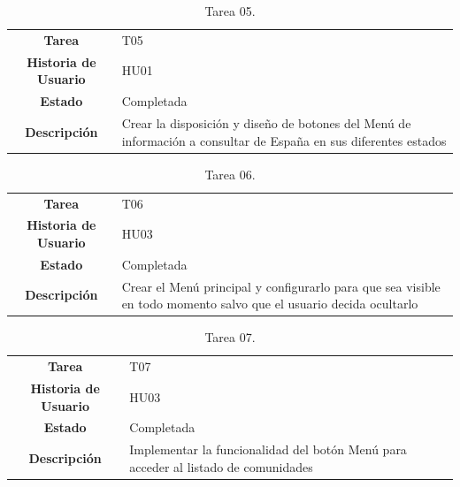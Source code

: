 \begin{table}[H]
	\begin{center}
		\begin{tabular}{| c | p{9cm} |}
			\hline
			
			\textbf{Tarea} & T05 \\
			\textbf{Historia de Usuario} & HU01 \\
			\textbf{Estado} & Completada \\
			\textbf{Descripción} & Crear la disposición y diseño de botones del Menú de información a consultar de España en sus diferentes estados \\ \hline
		\end{tabular}
		\caption{Tarea 05.}
	\end{center}
\end{table}

\begin{table}[H]
	\begin{center}
		\begin{tabular}{| c | p{9cm} |}
			\hline
			
			\textbf{Tarea} & T06 \\
			\textbf{Historia de Usuario} & HU03 \\
			\textbf{Estado} & Completada \\
			\textbf{Descripción} & Crear el Menú principal y configurarlo para que sea visible en todo momento salvo que el usuario decida ocultarlo \\ \hline
		\end{tabular}
		\caption{Tarea 06.}
	\end{center}
\end{table}

\begin{table}[H]
	\begin{center}
		\begin{tabular}{| c | p{9cm} |}
			\hline
			
			\textbf{Tarea} & T07 \\
			\textbf{Historia de Usuario} & HU03 \\
			\textbf{Estado} & Completada \\
			\textbf{Descripción} & Implementar la funcionalidad del botón Menú para acceder al listado de comunidades \\ \hline
		\end{tabular}
		\caption{Tarea 07.}
	\end{center}
\end{table}

